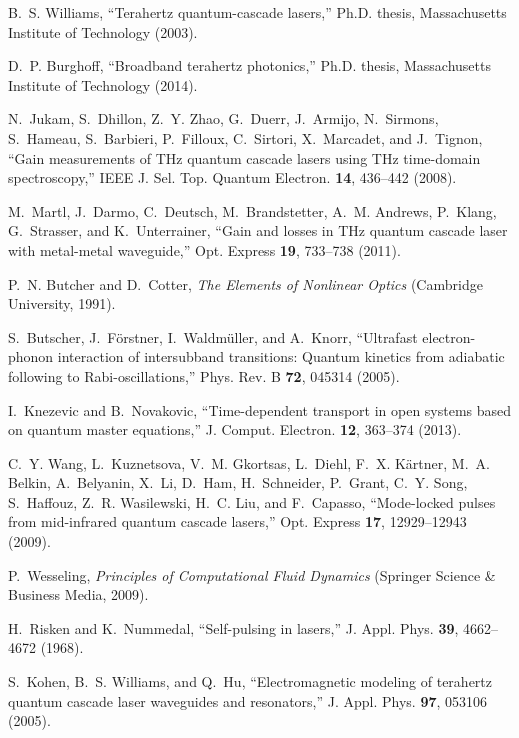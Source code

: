 \documentclass[10pt]{article}
\begin{document}
\begin{thebibliography}{10}
	B.~S. Williams, \enquote{Terahertz quantum-cascade lasers,} Ph.D. thesis,
	Massachusetts Institute of Technology (2003).
	
	D.~P. Burghoff, \enquote{Broadband terahertz photonics,} Ph.D. thesis,
	Massachusetts Institute of Technology (2014).
	
	N.~Jukam, S.~Dhillon, Z.~Y. Zhao, G.~Duerr, J.~Armijo, N.~Sirmons, S.~Hameau,
	S.~Barbieri, P.~Filloux, C.~Sirtori, X.~Marcadet, and J.~Tignon,
	\enquote{{Gain measurements of THz quantum cascade lasers using THz
			time-domain spectroscopy},} IEEE J. Sel. Top. Quantum Electron. \textbf{14},
	436--442 (2008).
	
	M.~Martl, J.~Darmo, C.~Deutsch, M.~Brandstetter, A.~M. Andrews, P.~Klang,
	G.~Strasser, and K.~Unterrainer, \enquote{Gain and losses in {THz} quantum
		cascade laser with metal-metal waveguide,} Opt. Express \textbf{19}, 733--738
	(2011).
	
	P.~N. Butcher and D.~Cotter, \emph{{The Elements of Nonlinear Optics}}
	(Cambridge University, 1991).
	
	S.~Butscher, J.~F{\"o}rstner, I.~Waldm{\"u}ller, and A.~Knorr,
	\enquote{Ultrafast electron-phonon interaction of intersubband transitions:
		Quantum kinetics from adiabatic following to {R}abi-oscillations,} Phys. Rev.
	B \textbf{72}, 045314 (2005).
	
	I.~Knezevic and B.~Novakovic, \enquote{Time-dependent transport in open systems
		based on quantum master equations,} J. Comput. Electron. \textbf{12},
	363--374 (2013).
	
	C.~Y. Wang, L.~Kuznetsova, V.~M. Gkortsas, L.~Diehl, F.~X. K\"{a}rtner, M.~A.
	Belkin, A.~Belyanin, X.~Li, D.~Ham, H.~Schneider, P.~Grant, C.~Y. Song,
	S.~Haffouz, Z.~R. Wasilewski, H.~C. Liu, and F.~Capasso, \enquote{Mode-locked
		pulses from mid-infrared quantum cascade lasers,} Opt. Express \textbf{17},
	12929--12943 (2009).
	
	P.~Wesseling, \emph{{Principles of Computational Fluid Dynamics}} 
	(Springer Science \& Business Media, 2009).
	
	H.~Risken and K.~Nummedal, \enquote{Self-pulsing in lasers,} J. Appl. Phys.
	\textbf{39}, 4662--4672 (1968).
	
	S.~Kohen, B.~S. Williams, and Q.~Hu, \enquote{Electromagnetic modeling of
		terahertz quantum cascade laser waveguides and resonators,} J. Appl. Phys.
	\textbf{97}, 053106 (2005).
	
\end{thebibliography}
\end{document}
